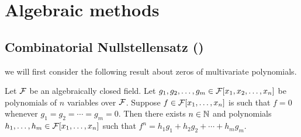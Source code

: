 
\section{Algebraic methods}

\subsection{Combinatorial Nullstellensatz (\cite{AlonTarsi89})}
 we will first consider the following result about zeros of multivariate polynomials.  
\begin{theorem*}
Let $\mathcal{F}$ be an algebraically closed field. Let $g_1,g_2,\dotsc,g_m \in \mathcal{F}[x_1,x_2,\dotsc,x_n]$ be polynomials of $n$ variables over $\mathcal{F}$. Suppose $f\in \mathcal{F}[x_1,\dotsc,x_n]$ is such that $f=0$ whenever $g_1=g_2=\dotsm = g_m = 0$.
Then there exists $n\in \mathbb{N}$ and polynomials $h_1,\dotsc,h_m \in \mathcal{F}[x_1,\dotsc,x_n]$ such that $f^n = h_1 g_1 + h_2 g_2 + \dotsm + h_m g_m$.
\end{theorem*}



